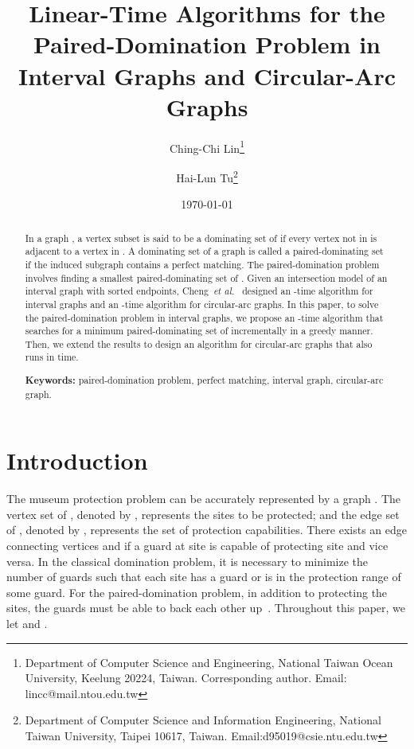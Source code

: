\documentclass[12pt]{article}
\title{{\bf Linear-Time Algorithms for the Paired-Domination Problem in Interval Graphs and Circular-Arc Graphs}}
\author{Ching-Chi Lin\thanks{Department of Computer Science and Engineering,
                             National Taiwan Ocean University,
                             Keelung 20224, Taiwan. Corresponding author.
                             Email: lincc@mail.ntou.edu.tw}
        \and
        Hai-Lun Tu\thanks{Department of Computer Science and
                          Information Engineering,
                          National Taiwan University,
                          Taipei 10617, Taiwan.
                          Email:d95019@csie.ntu.edu.tw}
        }
\date{\today}
\begin{document}
\maketitle

\begin{abstract}
In a graph , a vertex subset  is said to be a
dominating set of  if every vertex not in  is adjacent to a
vertex in . A dominating set  of a graph  is called a
paired-dominating set if the induced subgraph  contains a
perfect matching. The paired-domination problem involves finding a
smallest paired-dominating set of . Given an intersection model
of an interval graph  with sorted endpoints, Cheng~{\em et
al.}~\cite{CKN07} designed an -time algorithm for interval
graphs and an -time algorithm for circular-arc graphs.
In this paper, to solve the paired-domination problem in interval
graphs, we propose an -time algorithm that searches for a
minimum paired-dominating set of  incrementally in a greedy
manner. Then, we extend the results to design an algorithm for
circular-arc graphs that also runs in  time.

\bigskip

\noindent \textbf{Keywords:} paired-domination problem, perfect
matching, interval graph, circular-arc graph.


\end{abstract}

\newpage

\def\skippt{23pt}
\baselineskip \skippt

\section{Introduction}\label{section:intro}
The museum protection problem can be accurately represented by a
graph . The vertex set of , denoted by ,
represents the sites to be protected; and the edge set of ,
denoted by , represents the set of protection capabilities.
There exists an edge  connecting vertices  and  if a
guard at site  is capable of protecting site  and vice
versa. In the classical domination problem, it is necessary to
minimize the number of guards such that each site has a guard or
is in the protection range of some guard. For the
paired-domination problem, in addition to protecting the sites,
the guards must be able to back each other up~\cite{HS98}.
Throughout this paper, we let  and .
\end{document}
